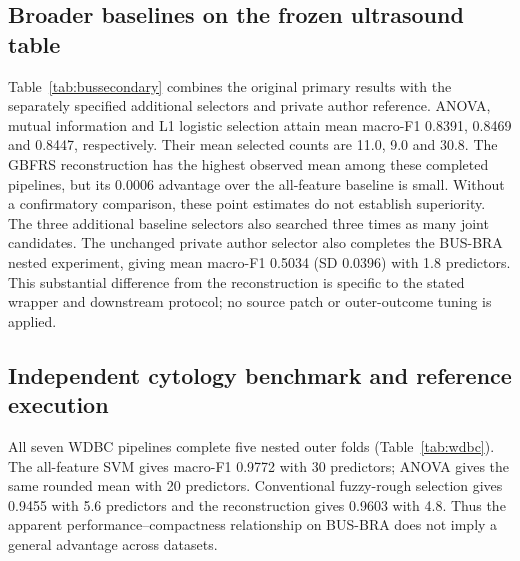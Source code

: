\documentclass[11pt,a4paper]{article}
\begin{document}
\subsection{Broader baselines on the frozen ultrasound table}
Table~\ref{tab:bussecondary} combines the original primary results with the separately specified additional selectors and private author reference. ANOVA, mutual information and L1 logistic selection attain mean macro-F1 0.8391, 0.8469 and 0.8447, respectively. Their mean selected counts are 11.0, 9.0 and 30.8. The GBFRS reconstruction has the highest observed mean among these completed pipelines, but its 0.0006 advantage over the all-feature baseline is small. Without a confirmatory comparison, these point estimates do not establish superiority. The three additional baseline selectors also searched three times as many joint candidates. The unchanged private author selector also completes the BUS-BRA nested experiment, giving mean macro-F1 0.5034 (SD 0.0396) with 1.8 predictors. This substantial difference from the reconstruction is specific to the stated wrapper and downstream protocol; no source patch or outer-outcome tuning is applied.
\begin{table}[htbp]\centering\small
\setlength{\tabcolsep}{3pt}
\BusSecondaryTable
\caption{BUS-BRA primary pipelines and secondary baselines under the supplied patient-grouped folds. Accuracy and feature counts are outer-fold means. Additional selector settings are inner-tuned; fixed selectors have a smaller joint search budget.}\label{tab:bussecondary}
\end{table}

\subsection{Independent cytology benchmark and reference execution}
All seven WDBC pipelines complete five nested outer folds (Table~\ref{tab:wdbc}). The all-feature SVM gives macro-F1 0.9772 with 30 predictors; ANOVA gives the same rounded mean with 20 predictors. Conventional fuzzy-rough selection gives 0.9455 with 5.6 predictors and the reconstruction gives 0.9603 with 4.8. Thus the apparent performance--compactness relationship on BUS-BRA does not imply a general advantage across datasets.
\end{document}
